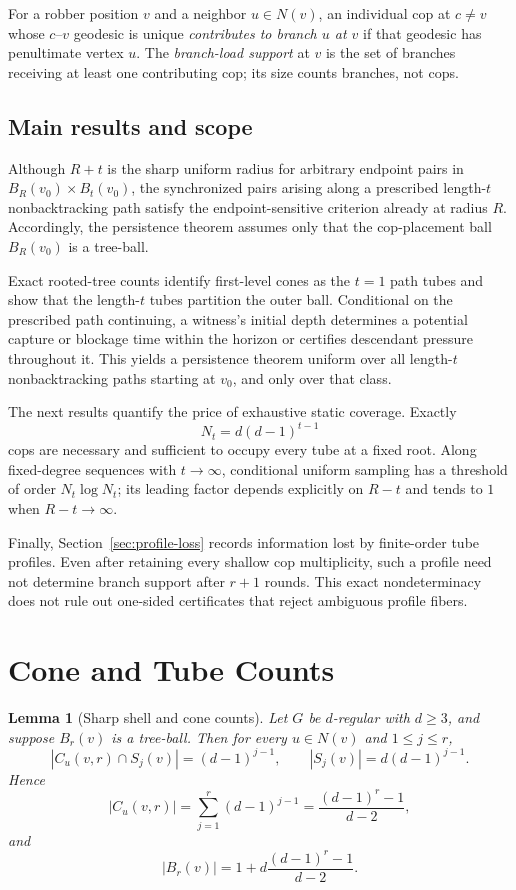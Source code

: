 \documentclass[11pt]{amsart}
\newtheorem{lemma}[theorem]{Lemma}
\theoremstyle{definition}
\begin{document}
For a robber position $v$ and a neighbor $u\in N(v)$, an individual cop at $c\neq v$ whose $c$--$v$ geodesic is unique \emph{contributes to branch $u$ at $v$} if that geodesic has penultimate vertex $u$. The \emph{branch-load support} at $v$ is the set of branches receiving at least one contributing cop; its size counts branches, not cops.

\subsection{Main results and scope}

Although $R+t$ is the sharp uniform radius for arbitrary endpoint pairs in $B_R(v_0)\times B_t(v_0)$, the synchronized pairs arising along a prescribed length-$t$ nonbacktracking path satisfy the endpoint-sensitive criterion already at radius $R$. Accordingly, the persistence theorem assumes only that the cop-placement ball $B_R(v_0)$ is a tree-ball.

Exact rooted-tree counts identify first-level cones as the $t=1$ path tubes and show that the length-$t$ tubes partition the outer ball. Conditional on the prescribed path continuing, a witness's initial depth determines a potential capture or blockage time within the horizon or certifies descendant pressure throughout it. This yields a persistence theorem uniform over all length-$t$ nonbacktracking paths starting at $v_0$, and only over that class.

The next results quantify the price of exhaustive static coverage. Exactly
\[
N_t=d(d-1)^{t-1}
\]
cops are necessary and sufficient to occupy every tube at a fixed root. Along fixed-degree sequences with $t\to\infty$, conditional uniform sampling has a threshold of order $N_t\log N_t$; its leading factor depends explicitly on $R-t$ and tends to $1$ when $R-t\to\infty$.

Finally, Section~\ref{sec:profile-loss} records information lost by finite-order tube profiles. Even after retaining every shallow cop multiplicity, such a profile need not determine branch support after $r+1$ rounds. This exact nondeterminacy does not rule out one-sided certificates that reject ambiguous profile fibers.

\section{Cone and Tube Counts}

\begin{lemma}[Sharp shell and cone counts]
\label{lem:shell}
Let $G$ be $d$-regular with $d\geq3$, and suppose $B_r(v)$ is a tree-ball. Then for every $u\in N(v)$ and $1\leq j\leq r$,
\[
|C_u(v,r)\cap S_j(v)|=(d-1)^{j-1},
\qquad
|S_j(v)|=d(d-1)^{j-1}.
\]
Hence
\[
|C_u(v,r)|=\sum_{j=1}^r(d-1)^{j-1}
=\frac{(d-1)^r-1}{d-2},
\]
and
\[
|B_r(v)|=1+d\frac{(d-1)^r-1}{d-2}.
\]
\end{lemma}
\end{document}
